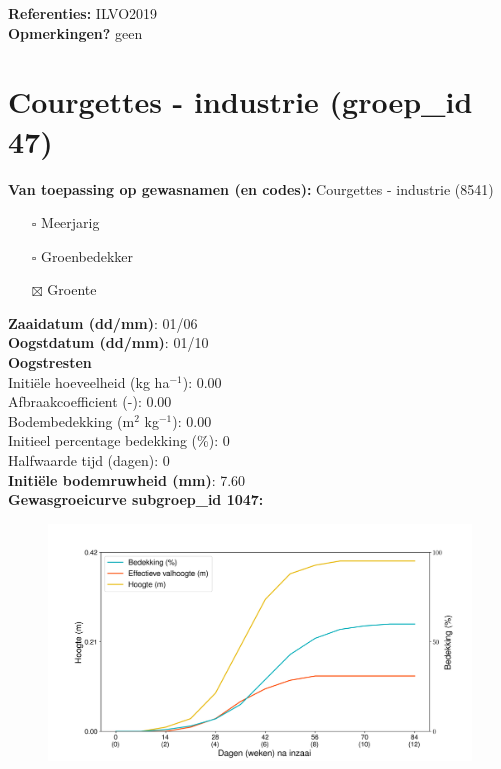 \documentclass{article}
\begin{document}
  \textbf{Referenties:} ILVO2019 \vspace{0.10cm} \\ 
  \textbf{Opmerkingen?} geen \vspace{0.10cm} \\ 
 \newpage 
 \section{Courgettes - industrie (groep\_id 47)} 
 \textbf{Van toepassing op gewasnamen (en codes):} Courgettes - industrie (8541) 
 \begin{multicols}{3} \begin{itemize} \item[$\square$] Meerjarig \item[$\square$] Groenbedekker \item[$\boxtimes$] Groente \end{itemize} \end{multicols} 
  \textbf{Zaaidatum (dd/mm)}: 01/06  \vspace{0.10cm} \\ 
  \textbf{Oogstdatum (dd/mm)}: 01/10  \vspace{0.10cm} \\ 
  \textbf{Oogstresten} \vspace{0.05cm} \\ 
  \tab Initi\"{e}le hoeveelheid (kg ha$^{-1}$): 0.00 \vspace{0.05cm} \\ 
  \tab Afbraakcoefficient (-): 0.00 \vspace{0.05cm} \\ 
  \tab Bodembedekking (m$^2$ kg$^{-1}$): 0.00 \vspace{0.05cm} \\ 
  \tab Initieel percentage bedekking (\%): 0 \vspace{0.05cm} \\ 
  \tab Halfwaarde tijd (dagen): 0 \vspace{0.05cm} \\ 
  \textbf{Initi\"{e}le bodemruwheid (mm)}: 7.60 \vspace{0.05cm} \\ 
  \textbf{Gewasgroeicurve subgroep\_id 1047:} 
 \begin{center} \begin{figure}[H] \includegraphics[width=12.5cm]{temp/1047.png} \end{figure} \end{center} 
\end{document}

